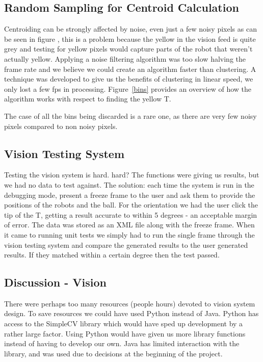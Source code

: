\subsection{Random Sampling for Centroid Calculation}

Centroiding can be strongly affected by noise, even just a few noisy pixels as
can be seen in figure \cite{vis1}, this is a problem  because the yellow in the
vision feed is quite grey and testing for yellow pixels would capture parts of
the robot that weren't actually yellow.  Applying a noise filtering algorithm
was too slow halving the frame rate and we believe we could create an algorithm
faster than clustering.  A technique was developed to give us the benefits of
clustering in linear speed, we only lost a few fps in processing.
Figure~\ref{bins} provides an overview of how the algorithm works with respect
to finding the yellow T.

The case of all the bins being discarded is a rare one, as there are very few
noisy pixels compared to non noisy pixels.  

\subsection{Vision Testing System}

Testing the vision system is hard. %
hard?  The functions %
were giving
us results, but we had no data to test against. The solution: each time the
system is run in the debugging mode, present a freeze frame to the user and ask
them to provide the positions of the robots and the ball. For the orientation
we had the user click the tip of the T, getting a result accurate to within 5
degrees - an acceptable margin of error. The data was stored as an XML file
along with the freeze frame. When it came to running unit tests we simply had
to run the single frame through the vision testing system and compare the
generated results to the user generated results. If they matched within a
certain degree then the test passed. 

\subsection{Discussion - Vision}

There were perhaps too many resources (people hours) devoted to vision system
design.  To save resources we could have used Python instead of Java. Python
has access to the SimpleCV library which would have sped up development by a
rather large factor.  Using Python would have given us more library functions
instead of having to develop our own. Java has limited interaction with the
library, and was used due to decisions at the beginning of the project.
